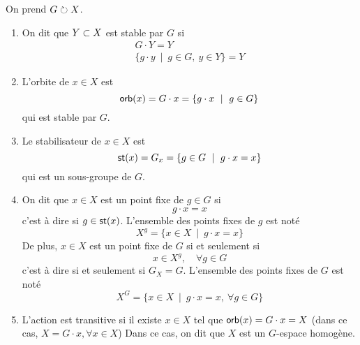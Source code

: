 \begin{definition}
    On prend \(G \circlearrowright X\). 
    \begin{enumerate}
        \item On dit que \(Y\subset X\) est stable par \(G\) si 
        \begin{equation*}
            \begin{aligned}
                G\cdot Y = Y\\
                \{g\cdot y\ \mid\ g\in G,\ y\in Y\} = Y
            \end{aligned}
        \end{equation*}

        \item L'orbite de \(x\in X\) est
        \begin{equation*}
            \orb(x) = G\cdot x= \{g\cdot x\ \mid\ g\in G\}
        \end{equation*}
        qui est stable par \(G\).

        \item Le stabilisateur de \(x\in X\) est
        \begin{equation*}
            \operatorname{\mathsf{st}}(x) = G_x = \{g\in G\ \mid\ g\cdot x = x\}
        \end{equation*}
        qui est un sous-groupe de \(G\).

        \item On dit que \(x\in X\) est un point fixe de \(g\in G\) si
        \begin{equation*}
            g\cdot x = x
        \end{equation*}
        c'est à dire si \(g\in\operatorname{\mathsf{st}}(x)\).
        L'ensemble des points fixes de \(g\) est noté
        \begin{equation*}
            X^g = \{x\in X\ \mid\ g\cdot x = x\}
        \end{equation*}
        De plus, \(x\in X\) est un point fixe de \(G\) si et seulement si
        \begin{equation*}
            x\in X^g,\quad\forall g\in G
        \end{equation*}
        c'est à dire si et seulement si \(G_X = G\). L'ensemble des points fixes de \(G\) est
        noté
        \begin{equation*}
            X^G = \{x\in X\ \mid\ g\cdot x = x,\ \forall g\in G\}
        \end{equation*}

        \item L'action est transitive si il existe \(x \in X\)
        tel que \(\operatorname{\mathsf{orb}}(x) = G\cdot x = X\) (dans ce cas, \(X = G\cdot x,\forall x\in X\))
        Dans ce cas, on dit que \(X\) est un \(G\)-espace homogène.

    \end{enumerate}
\end{definition}